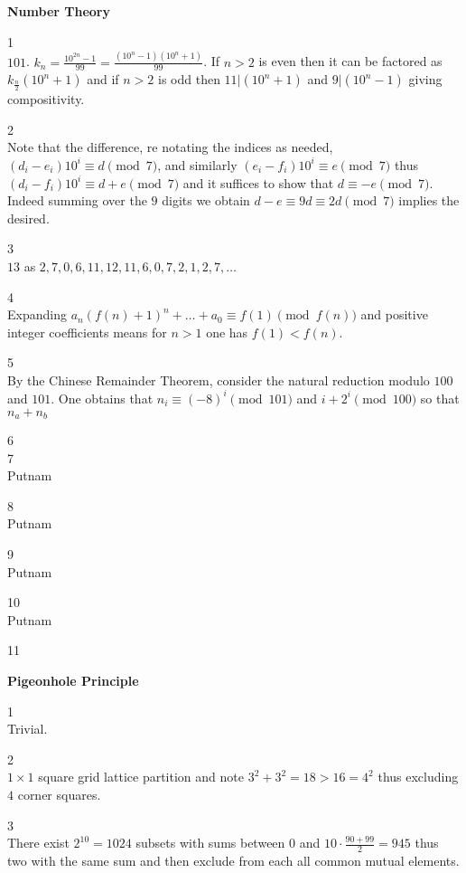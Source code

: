 \textbf{Number Theory}

1 \\
$\boxed{101}$. $k_n=\frac{10^{2n}-1}{99}=\frac{(10^n-1)(10^n+1)}{99}$. If $n>2$ is even then it can be factored as $k_{\frac{n}{2}}(10^n+1)$ and if $n>2$ is odd then $11|(10^n+1)$ and $9|(10^n-1)$ giving compositivity.

2 \\
Note that the difference, re notating the indices as needed, $(d_i-e_i)10^i \equiv d \pmod{7}$, and similarly $(e_i-f_i)10^i \equiv e \pmod{7}$ thus $(d_i-f_i)10^i \equiv d+e \pmod{7}$ and it suffices to show that $d \equiv -e \pmod{7}$. Indeed summing over the $9$ digits we obtain $d-e \equiv 9d \equiv 2d \pmod{7}$ implies the desired.

3 \\
$\boxed{13}$ as $2,7,0,6,11,12,11,6,0,7,2,1,2,7,\dots$

4 \\
Expanding $a_n (f(n)+1)^n+\dots+a_0 \equiv f(1) \pmod{f(n)}$ and positive integer coefficients means for $n>1$ one has $f(1) < f(n)$.

5 \\
By the Chinese Remainder Theorem, consider the natural reduction modulo $100$ and $101$. One obtains that $n_i \equiv (-8)^i \pmod{101}$ and $i+2^i \pmod{100}$ so that $n_a+n_b$

6 \\


7 \\
Putnam

8 \\
Putnam

9 \\
Putnam

10 \\
Putnam

11 \\


\newpage

\textbf{Pigeonhole Principle}

1 \\
Trivial.

2 \\
$1 \times 1$ square grid lattice partition and note $3^2+3^2=18>16=4^2$ thus excluding $4$ corner squares.

3 \\
There exist $2^{10}=1024$ subsets with sums between $0$ and $10 \cdot \frac{90+99}{2}=945$ thus two with the same sum and then exclude from each all common mutual elements.

